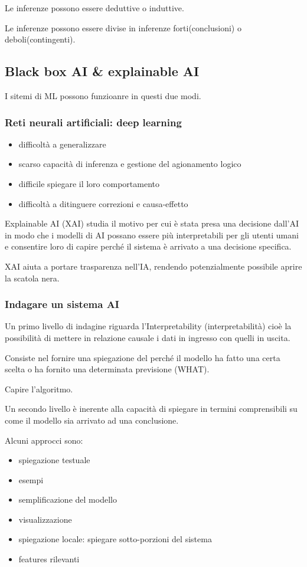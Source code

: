 Le inferenze possono essere deduttive o induttive.

Le inferenze possono essere divise in inferenze forti(conclusioni) o deboli(contingenti).

\subsection{Black box AI \& explainable AI}
I sitemi di ML possono funzioanre in questi due modi.


\subsubsection{Reti neurali artificiali: deep learning}
\begin{itemize}
    \item difficoltà a generalizzare
    \item scarso capacità di inferenza e gestione del agionamento logico
    \item difficile spiegare il loro comportamento
    \item difficoltà a ditinguere correzioni e causa-effetto
\end{itemize}

Explainable AI (XAI) studia il motivo per cui è stata presa una decisione
dall’AI in modo che i modelli di AI possano essere più interpretabili per gli
utenti umani e consentire loro di capire perché il sistema è arrivato a una
decisione specifica.

XAI aiuta a portare trasparenza nell'IA, rendendo potenzialmente possibile
aprire la scatola nera.

\subsubsection{Indagare un sistema AI}

Un primo livello di indagine riguarda l’Interpretability (interpretabilità)
cioè la possibilità di mettere in relazione causale i dati in ingresso con
quelli in uscita.

Consiste nel fornire una spiegazione del perché il modello ha fatto una
certa scelta o ha fornito una determinata previsione (WHAT).

Capire l'algoritmo.

Un secondo livello è inerente alla capacità di spiegare in termini comprensibili su come il modello sia
arrivato ad una conclusione.


Alcuni approcci sono:
\begin{itemize}
    \item spiegazione testuale
    \item esempi
    \item semplificazione del modello
    \item visualizzazione
    \item spiegazione locale: spiegare sotto-porzioni del sistema
    \item features rilevanti
\end{itemize}





















